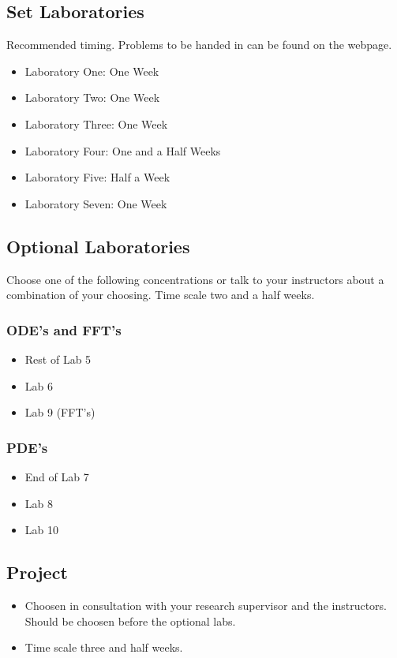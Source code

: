 \documentclass[10pt]{article}
\begin{document}
\subsection*{Set Laboratories}
Recommended timing.  Problems to be handed in can be found on the webpage.

\begin{itemize}
\item Laboratory One: One Week
\item Laboratory Two: One Week
\item Laboratory Three: One Week
\item Laboratory Four: One and a Half Weeks
\item Laboratory Five: Half a Week
\item Laboratory Seven: One Week
\end{itemize}


\subsection*{Optional Laboratories}

Choose one of the following concentrations or talk to your instructors
about a combination of your choosing.  Time scale two and
a half weeks. 

\subsubsection*{ODE's and FFT's}

\begin{itemize}
\item Rest of Lab 5 
\item Lab 6
\item Lab 9 (FFT's)
\end{itemize}

\subsubsection*{PDE's}

\begin{itemize}
\item End of Lab 7
\item Lab 8
\item Lab 10
\end{itemize}


\subsection*{Project}

\begin{itemize}
\item Choosen in consultation with your research supervisor and the
instructors.  Should be choosen before the optional labs.
\item Time scale three and half weeks.
\end{itemize}

\clearpage


\end{document}
